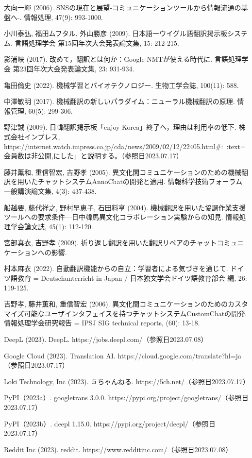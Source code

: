 \documentclass[b5paper,12pt]{jsreport}
\begin{document}
\begin{thebibliography}{99}

大向一輝 (2006). SNSの現在と展望-コミュニケーションツールから情報流通の基盤へ-. 情報処理, 47(9): 993-1000.

小川泰弘, 福田ムフタル, 外山勝彦 (2009). 日本語ーウイグル語翻訳掲示板システム. 言語処理学会 第15回年次大会発表論文集, 15: 212-215.

影浦峡 (2017). 改めて，翻訳とは何か：Google NMTが使える時代に. 言語処理学会 第23回年次大会発表論文集, 23: 931-934.

亀田倫史 (2022). 機械学習とバイオテクノロジー. 生物工学会誌, 100(11): 588.

中澤敏明 (2017). 機械翻訳の新しいパラダイム：ニューラル機械翻訳の原理. 情報管理, 60(5): 299-306.

野津誠 (2009). 日韓翻訳掲示板「enjoy Korea」終了へ，理由は利用率の低下. 株式会社インプレス, https://internet.watch.impress.co.jp/cda/news/2009/02/12/22405.html\#:~:text=会員数は非公開,にした」と説明する。（参照日2023.07.17）

藤井薫和, 重信智宏, 吉野孝 (2005). 異文化間コミュニケーションのための機械翻訳を用いたチャットシステムAnnoChatの開発と適用. 情報科学技術フォーラム一般講演論文集, 4(3): 437-438.

船越要, 藤代祥之, 野村早恵子, 石田料亨 (2004). 機械翻訳を用いた協調作業支援ツールへの要求条件—日中韓馬異文化コラボレーション実験からの知見. 情報処理学会論文誌, 45(1): 112-120.

宮部真衣, 吉野孝 (2009). 折り返し翻訳を用いた翻訳リペアのチャットコミュニケーションへの影響.

村本麻衣 (2022). 自動翻訳機能からの自立：学習者による気づきを通じて. ドイツ語教育 = Deutschunterricht in Japan / 日本独文学会ドイツ語教育部会 編, 26: 119-125.

吉野孝, 藤井薫和, 重信智宏 (2006). 異文化間コミュニケーションのためのカスタマイズ可能なユーザインタフェイスを持つチャットシステムCustomChatの開発. 情報処理学会研究報告 = IPSJ SIG technical reports, (60): 13-18.

DeepL (2023). DeepL. https://jobs.deepl.com/（参照日2023.07.08）

Google Cloud (2023). Translation AI. https://cloud.google.com/translate?hl=ja（参照日2023.07.17）

Loki Technology, Inc (2023). ５ちゃんねる. https://5ch.net/（参照日2023.07.17）

PyPI（2023a）. googletrans 3.0.0. https://pypi.org/project/googletrans/（参照日2023.07.17）

PyPI（2023b）. deepl 1.15.0. https://pypi.org/project/deepl/（参照日2023.07.17）

Reddit Inc (2023). reddit. https://www.redditinc.com/（参照日2023.07.08）

\end{thebibliography}
    
\end{document}
